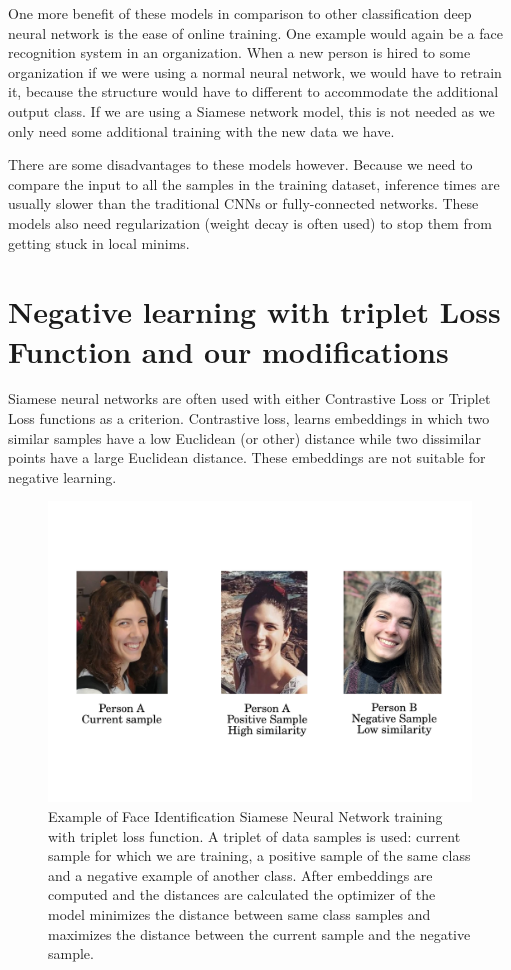 \documentclass[b5paper]{book}
\begin{document}
One more benefit of these models in comparison to other classification deep neural network is the ease of online training. One example would again be a face recognition system in an organization. When a new person is hired to some organization if we were using a normal neural network, we would have to retrain it, because the structure would have to different to accommodate the additional output class. If we are using a Siamese network model, this is not needed as we only need some additional training with the new data we have. 

There are some disadvantages to these models however. Because we need to compare the input to all the samples in the training dataset, inference times are usually slower than the traditional CNNs or fully-connected networks. These models also need regularization (weight decay is often used) to stop them from getting stuck in local minims. 

\section{Negative learning with triplet Loss Function and our modifications}

Siamese neural networks are often used with either Contrastive Loss or Triplet Loss functions as a criterion. Contrastive loss, learns embeddings in which two similar samples have a low Euclidean (or other) distance while two dissimilar points have a large Euclidean distance. These embeddings are not suitable for negative learning.

\begin{figure}
    \centering
    \includegraphics[trim=0.5cm 2.6cm 0.5cm 5cm,scale=0.73]{figures/siamese.pdf}
    \caption{Example of Face Identification Siamese Neural Network training with triplet loss function. A triplet of data samples is used: current sample for which we are training, a positive sample of the same class and a negative example of another class. After embeddings are computed and the distances are calculated the optimizer of the model minimizes the distance between same class samples and maximizes the distance between the current sample and the negative sample.}
    \label{fig:siamese}
\end{figure}
\end{document}
